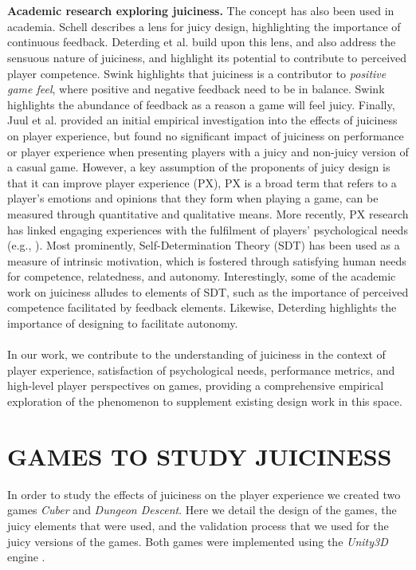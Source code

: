 \documentclass{sigchi}
\begin{document}
\\\\
\textbf{Academic research exploring juiciness.} The concept has also been used in academia. Schell \cite{schell2014art} describes a lens for juicy design, highlighting the importance of continuous feedback. Deterding et al. \cite{deterding2015lens} build upon this lens, and also address the sensuous nature of juiciness, and highlight its potential to contribute to perceived player competence. Swink \cite{swink2008game} highlights that juiciness is a contributor to \textit{positive game feel}, where positive and negative feedback need to be in balance. Swink highlights the abundance of feedback as a reason a game will feel juicy. Finally, Juul et al. \cite{juul2016good} provided an initial empirical investigation into the effects of juiciness on player experience, but found no significant impact of juiciness on performance or player experience when presenting players with a juicy and non-juicy version of a casual game. However, a key assumption of the proponents of juicy design is that it can improve player experience (PX), PX is a broad term that refers to a player's emotions and opinions that they form when playing a game, can be measured through quantitative and qualitative means. More recently, PX research has linked engaging experiences with the fulfilment of players' psychological needs (e.g., \cite{ryan2006motivational}). Most prominently, Self-Determination Theory (SDT) \cite{deci1985intrinsic,ryan2000self} has been used as a measure of intrinsic motivation, which is fostered through satisfying human needs for competence, relatedness, and autonomy. Interestingly, some of the academic work on juiciness alludes to elements of SDT, such as the importance of perceived competence facilitated by feedback elements\cite{swink2008game}. Likewise, Deterding \cite{deterding2016contextual} highlights the importance of designing to facilitate autonomy.
\\\\
In our work, we contribute to the understanding of juiciness in the context of player experience, satisfaction of psychological needs, performance metrics, and high-level player perspectives on games, providing a comprehensive empirical exploration of the phenomenon to supplement existing design work in this space.

\section{GAMES TO STUDY JUICINESS}
In order to study the effects of juiciness on the player experience we created two games \textit{Cuber} and \textit{Dungeon Descent}. Here we detail the design of the games, the juicy elements that were used, and the validation process that we used for the juicy versions of the games. Both games were implemented using the \textit{Unity3D} engine \cite{Unity3D:pc}.  
\end{document}
